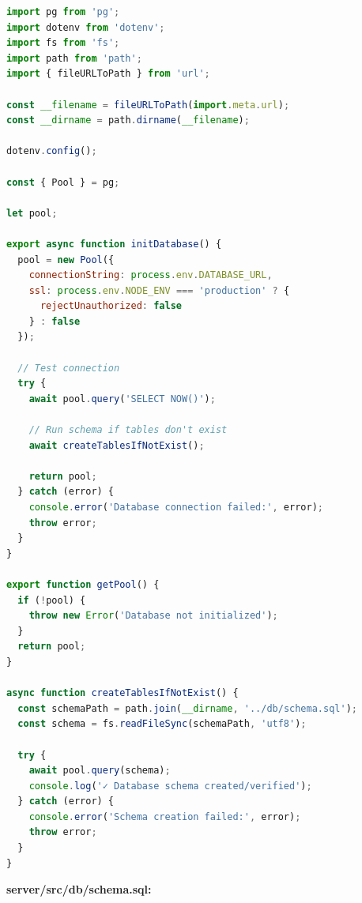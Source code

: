 \documentclass[11pt,a4paper]{article}
\begin{document}
\begin{lstlisting}[language=JavaScript]
import pg from 'pg';
import dotenv from 'dotenv';
import fs from 'fs';
import path from 'path';
import { fileURLToPath } from 'url';

const __filename = fileURLToPath(import.meta.url);
const __dirname = path.dirname(__filename);

dotenv.config();

const { Pool } = pg;

let pool;

export async function initDatabase() {
  pool = new Pool({
    connectionString: process.env.DATABASE_URL,
    ssl: process.env.NODE_ENV === 'production' ? {
      rejectUnauthorized: false
    } : false
  });
  
  // Test connection
  try {
    await pool.query('SELECT NOW()');
    
    // Run schema if tables don't exist
    await createTablesIfNotExist();
    
    return pool;
  } catch (error) {
    console.error('Database connection failed:', error);
    throw error;
  }
}

export function getPool() {
  if (!pool) {
    throw new Error('Database not initialized');
  }
  return pool;
}

async function createTablesIfNotExist() {
  const schemaPath = path.join(__dirname, '../db/schema.sql');
  const schema = fs.readFileSync(schemaPath, 'utf8');
  
  try {
    await pool.query(schema);
    console.log('✓ Database schema created/verified');
  } catch (error) {
    console.error('Schema creation failed:', error);
    throw error;
  }
}
\end{lstlisting}

\textbf{server/src/db/schema.sql:}
\end{document}
